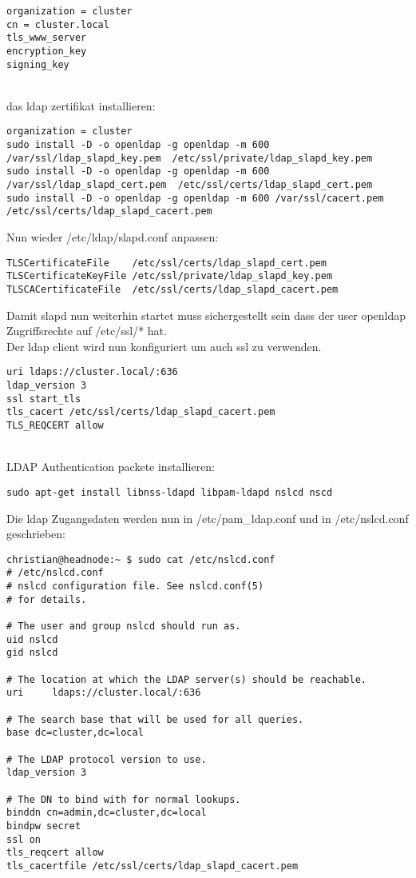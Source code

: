 \begin{lstlisting}[style=Bash]
organization = cluster
cn = cluster.local
tls_www_server
encryption_key
signing_key
\end{lstlisting}
\\
das ldap zertifikat installieren:
\begin{lstlisting}[style=Bash]
organization = cluster
sudo install -D -o openldap -g openldap -m 600 /var/ssl/ldap_slapd_key.pem  /etc/ssl/private/ldap_slapd_key.pem
sudo install -D -o openldap -g openldap -m 600 /var/ssl/ldap_slapd_cert.pem  /etc/ssl/certs/ldap_slapd_cert.pem
sudo install -D -o openldap -g openldap -m 600 /var/ssl/cacert.pem  /etc/ssl/certs/ldap_slapd_cacert.pem 
\end{lstlisting}
Nun wieder /etc/ldap/slapd.conf anpassen:
\begin{lstlisting}[style=Bash]
TLSCertificateFile    /etc/ssl/certs/ldap_slapd_cert.pem
TLSCertificateKeyFile /etc/ssl/private/ldap_slapd_key.pem
TLSCACertificateFile  /etc/ssl/certs/ldap_slapd_cacert.pem
\end{lstlisting}
Damit slapd nun weiterhin startet muss sichergestellt sein dass der user openldap Zugriffsrechte auf /etc/ssl/* hat.
\\
Der ldap client wird nun konfiguriert um auch ssl zu verwenden.
\begin{lstlisting}[style=Bash]
uri ldaps://cluster.local/:636
ldap_version 3
ssl start_tls
tls_cacert /etc/ssl/certs/ldap_slapd_cacert.pem
TLS_REQCERT allow
\end{lstlisting}
\\
LDAP Authentication
packete installieren:
\begin{lstlisting}[style=Bash]
sudo apt-get install libnss-ldapd libpam-ldapd nslcd nscd
\end{lstlisting}

Die ldap Zugangsdaten werden nun in /etc/pam_ldap.conf und in /etc/nslcd.conf geschrieben:
\begin{lstlisting}[style=Bash]
christian@headnode:~ $ sudo cat /etc/nslcd.conf 
# /etc/nslcd.conf
# nslcd configuration file. See nslcd.conf(5)
# for details.

# The user and group nslcd should run as.
uid nslcd
gid nslcd

# The location at which the LDAP server(s) should be reachable.
uri     ldaps://cluster.local/:636

# The search base that will be used for all queries.
base dc=cluster,dc=local

# The LDAP protocol version to use.
ldap_version 3

# The DN to bind with for normal lookups.
binddn cn=admin,dc=cluster,dc=local
bindpw secret
ssl on
tls_reqcert allow
tls_cacertfile /etc/ssl/certs/ldap_slapd_cacert.pem
\end{lstlisting}

